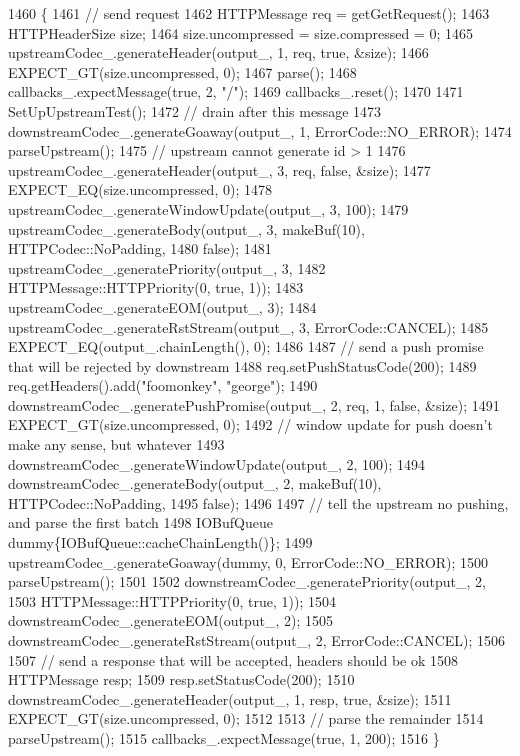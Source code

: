 \begin{DoxyCode}
1460                                        \{
1461   \textcolor{comment}{// send request}
1462   HTTPMessage req = getGetRequest();
1463   HTTPHeaderSize size;
1464   size.uncompressed = size.compressed = 0;
1465   upstreamCodec\_.generateHeader(output\_, 1, req, \textcolor{keyword}{true}, &size);
1466   EXPECT\_GT(size.uncompressed, 0);
1467   parse();
1468   callbacks\_.expectMessage(\textcolor{keyword}{true}, 2, \textcolor{stringliteral}{"/"});
1469   callbacks\_.reset();
1470 
1471   SetUpUpstreamTest();
1472   \textcolor{comment}{// drain after this message}
1473   downstreamCodec\_.generateGoaway(output\_, 1, ErrorCode::NO\_ERROR);
1474   parseUpstream();
1475   \textcolor{comment}{// upstream cannot generate id > 1}
1476   upstreamCodec\_.generateHeader(output\_, 3, req, \textcolor{keyword}{false}, &size);
1477   EXPECT\_EQ(size.uncompressed, 0);
1478   upstreamCodec\_.generateWindowUpdate(output\_, 3, 100);
1479   upstreamCodec\_.generateBody(output\_, 3, makeBuf(10), HTTPCodec::NoPadding,
1480                               \textcolor{keyword}{false});
1481   upstreamCodec\_.generatePriority(output\_, 3,
1482                                   HTTPMessage::HTTPPriority(0, \textcolor{keyword}{true}, 1));
1483   upstreamCodec\_.generateEOM(output\_, 3);
1484   upstreamCodec\_.generateRstStream(output\_, 3, ErrorCode::CANCEL);
1485   EXPECT\_EQ(output\_.chainLength(), 0);
1486 
1487   \textcolor{comment}{// send a push promise that will be rejected by downstream}
1488   req.setPushStatusCode(200);
1489   req.getHeaders().add(\textcolor{stringliteral}{"foomonkey"}, \textcolor{stringliteral}{"george"});
1490   downstreamCodec\_.generatePushPromise(output\_, 2, req, 1, \textcolor{keyword}{false}, &size);
1491   EXPECT\_GT(size.uncompressed, 0);
1492   \textcolor{comment}{// window update for push doesn't make any sense, but whatever}
1493   downstreamCodec\_.generateWindowUpdate(output\_, 2, 100);
1494   downstreamCodec\_.generateBody(output\_, 2, makeBuf(10), HTTPCodec::NoPadding,
1495                                 \textcolor{keyword}{false});
1496 
1497   \textcolor{comment}{// tell the upstream no pushing, and parse the first batch}
1498   IOBufQueue dummy\{IOBufQueue::cacheChainLength()\};
1499   upstreamCodec\_.generateGoaway(dummy, 0, ErrorCode::NO\_ERROR);
1500   parseUpstream();
1501 
1502   downstreamCodec\_.generatePriority(output\_, 2,
1503                                     HTTPMessage::HTTPPriority(0, \textcolor{keyword}{true}, 1));
1504   downstreamCodec\_.generateEOM(output\_, 2);
1505   downstreamCodec\_.generateRstStream(output\_, 2, ErrorCode::CANCEL);
1506 
1507   \textcolor{comment}{// send a response that will be accepted, headers should be ok}
1508   HTTPMessage resp;
1509   resp.setStatusCode(200);
1510   downstreamCodec\_.generateHeader(output\_, 1, resp, \textcolor{keyword}{true}, &size);
1511   EXPECT\_GT(size.uncompressed, 0);
1512 
1513   \textcolor{comment}{// parse the remainder}
1514   parseUpstream();
1515   callbacks\_.expectMessage(\textcolor{keyword}{true}, 1, 200);
1516 \}
\end{DoxyCode}


